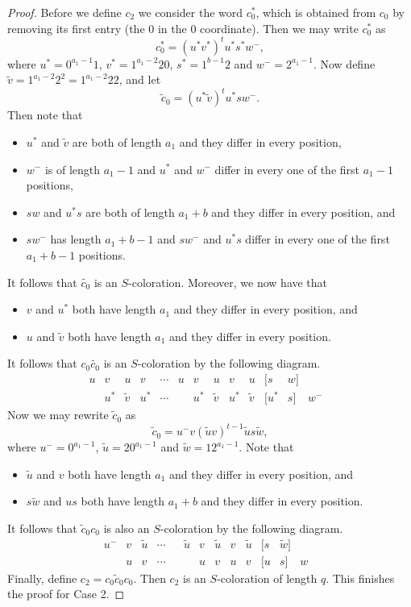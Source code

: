 \documentclass[10pt,a4paper]{amsart}
\begin{document}
\begin{proof}
Before we define $c_2$ we consider the word $c_0^*$, which is obtained from $c_0$ by removing its first entry (the $0$ in the $0$ coordinate). Then we may write $c_0^*$ as
$$ c_0^*=(u^*v^*)^t u^*s^*w^-, $$
where $u^*=0^{a_1-1}1$, $v^*=1^{a_1-2}20$, $s^*=1^{b-1}2$ and $w^-=2^{a_1-1}$. Now define $\tilde{v}=1^{a_1-2}2^2=1^{a_1-2}22$, and let
$$ \tilde{c}_0=(u^*\tilde{v})^tu^*sw^-. $$
Then note that 
\begin{itemize}
\item $u^*$ and $\tilde{v}$ are both of length $a_1$ and they differ in every position, 
\item $w^-$ is of length $a_1-1$ and $u^*$ and $w^-$ differ in every one of the first $a_1-1$ positions, 
\item $sw$ and $u^*s$ are both of length $a_1+b$ and they differ in every position, and
\item $sw^-$ has length $a_1+b-1$ and $sw^-$ and $u^*s$ differ in every one of the first $a_1+b-1$ positions.
\end{itemize}
It follows that $\tilde{c_0}$ is an $S$-coloration. Moreover, we now have that 
\begin{itemize}
\item $v$ and $u^*$ both have length $a_1$ and they differ in every position, and
\item $u$ and $\tilde{v}$ both have length $a_1$ and they differ in every position.  
\end{itemize}
It follows that $c_0\tilde{c_0}$ is an $S$-coloration by the following diagram.
$$  \begin{array}{rccccccccccccl}
u & v & u & v & \cdots & u & v & u & v & u & [s & w] &  & \\
   & u^* & \tilde{v} & u^* & \cdots &    & u^* & \tilde{v} & u^* & \tilde{v} & [u^* & s] & w^- & 
      \end{array}
   $$
Now we may rewrite $\tilde{c}_0$ as
$$ \tilde{c}_0=u^{-}v(\tilde{u}v)^{t-1}\tilde{u}s\tilde{w}, $$
where $u^{-}=0^{a_1-1}$, $\tilde{u}=20^{a_1-1}$ and $\tilde{w}=12^{a_1-1}$. Note that
\begin{itemize}
\item $\tilde{u}$ and $v$ both have length $a_1$ and they differ in every position, and
\item $s\tilde{w}$ and $us$ both have length $a_1+b$ and they differ in every position.
\end{itemize}
It follows that $\tilde{c}_0c_0$ is also an $S$-coloration by the following diagram.
$$  \begin{array}{rccccccccccccl}
    u^{-} & v& \tilde{u} & \cdots &    & \tilde{u} &v & \tilde{u} & v & \tilde{u} & [s & \tilde{w}] & \\  
& u & v & \cdots &  & & u & v & u & v & [u & s] & w &       \end{array}
   $$
Finally, define $c_2=c_0\tilde{c}_0c_0$. Then $c_2$ is an $S$-coloration of length $q$. This finishes the proof for Case 2.



\end{proof}
\end{document}
